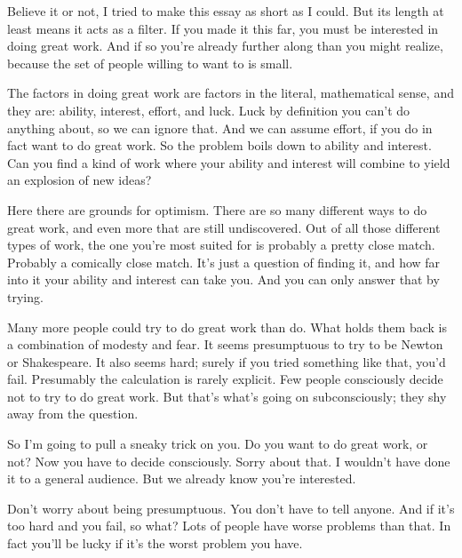                   Believe it or not, I tried to make this essay as short as I
                  could. But its length at least means it acts as a filter. If
                  you made it this far, you must be interested in doing great
                  work. And if so you're already further along than you might
                  realize, because the set of people willing to want to is
                  small.

The factors in doing great work are factors
                  in the literal, mathematical sense, and they are: ability,
                  interest, effort, and luck. Luck by definition you can't do
                  anything about, so we can ignore that. And we can assume
                  effort, if you do in fact want to do great work. So the
                  problem boils down to ability and interest. Can you find a
                  kind of work where your ability and interest will combine to
                  yield an explosion of new ideas?

Here there are
                  grounds for optimism. There are so many different ways to do
                  great work, and even more that are still undiscovered. Out of
                  all those different types of work, the one you're most suited
                  for is probably a pretty close match. Probably a comically
                  close match. It's just a question of finding it, and how far
                  into it your ability and interest can take you. And you can
                  only answer that by trying.

Many more people could
                  try to do great work than do. What holds them back is a
                  combination of modesty and fear. It seems presumptuous to try
                  to be Newton or Shakespeare. It also seems hard; surely if you
                  tried something like that, you'd fail. Presumably the
                  calculation is rarely explicit. Few people consciously decide
                  not to try to do great work. But that's what's going on
                  subconsciously; they shy away from the question.

So
                  I'm going to pull a sneaky trick on you. Do you want to do
                  great work, or not? Now you have to decide consciously. Sorry
                  about that. I wouldn't have done it to a general audience. But
                  we already know you're interested.

Don't worry
                  about being presumptuous. You don't have to tell anyone. And
                  if it's too hard and you fail, so what? Lots of people have
                  worse problems than that. In fact you'll be lucky if it's the
                  worst problem you have.

